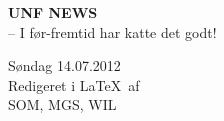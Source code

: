 \begin{minipage}[b]{0.35\linewidth}
\Huge \textbf{UNF NEWS} \\
\Large -- I før-fremtid har katte det godt!
\end{minipage}
\begin{minipage}[b]{0.4\linewidth}
\Large Søndag 14.07.2012 \\
\normalsize Redigeret i \LaTeX\ af \\ SOM, MGS, WIL

\end{minipage}